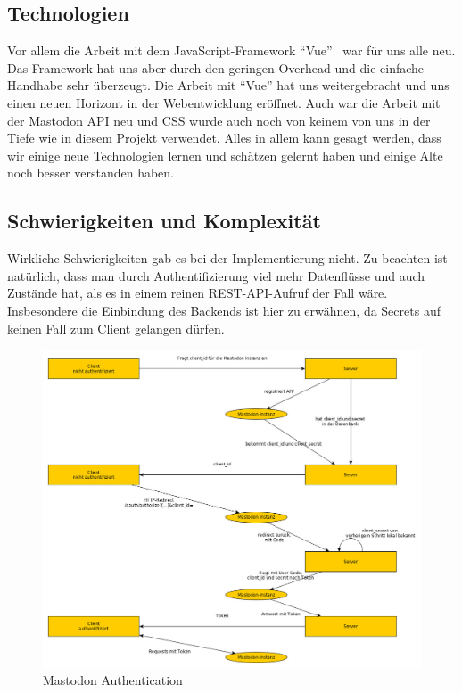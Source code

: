 \documentclass[fleqn,10pt]{SelfArx} %
\begin{document}
\subsection{Technologien}
Vor allem die Arbeit mit dem JavaScript-Framework \enquote{Vue}~\cite{vue} war für uns alle neu. Das Framework hat uns aber durch den geringen Overhead und die einfache Handhabe sehr überzeugt. Die Arbeit mit \enquote{Vue} hat uns weitergebracht und uns einen neuen Horizont in der Webentwicklung eröffnet. 
Auch war die Arbeit mit der Mastodon API neu und CSS wurde auch noch von keinem von uns in der Tiefe wie in diesem Projekt verwendet. Alles in allem kann gesagt werden, dass wir einige neue Technologien lernen und schätzen gelernt haben und einige Alte noch besser verstanden haben.
\subsection{Schwierigkeiten und Komplexität}
Wirkliche Schwierigkeiten gab es bei der Implementierung nicht. Zu beachten ist natürlich, dass man durch Authentifizierung viel mehr Datenflüsse und auch Zustände hat, als es in einem reinen REST-API-Aufruf der Fall wäre. Insbesondere die Einbindung des Backends ist hier zu erwähnen, da Secrets auf keinen Fall zum Client gelangen dürfen.
\begin{figure}
\includegraphics[width=\linewidth]{mastodon.jpg}
\caption{Mastodon Authentication}\label{fig:mastodon1}
\end{figure}
\end{document}
